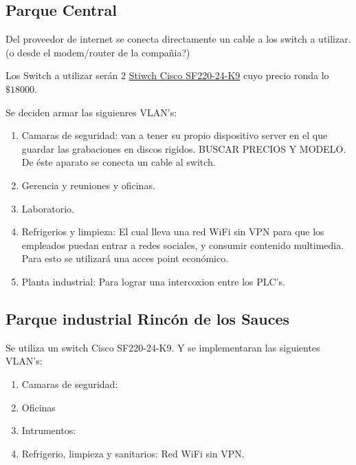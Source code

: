 \documentclass[11pt]{article}
\begin{document}
    \subsection*{Parque Central}

        Del proveedor de internet se conecta directamente un cable a los switch a utilizar. (o desde el modem/router de la compañia?)

        Los Switch a utilizar serán $2$ \href{https://articulo.mercadolibre.com.ar/MLA-714545399-switch-cisco-semi-admin-24-puertos-10100-2-giga-sf220-24-k9-_JM#position=34&type=item&tracking_id=4df4b6b4-1084-45cf-bab2-a07d312cf877}{Stiwch Cisco SF220-24-K9}
        cuyo precio ronda lo $\$18000$.


        Se deciden armar las siguienres VLAN's: 

        \begin{enumerate}
            \item Camaras de seguridad: van a tener su propio dispositivo server en el que guardar las grabaciones en discos rigidos. BUSCAR PRECIOS Y MODELO. De éste aparato se conecta un cable al switch.
            \item Gerencia y reuniones y oficinas.
            \item Laboratorio.
            \item Refrigerios y limpieza: El cual lleva una red WiFi sin VPN para que los empleados puedan entrar a redes sociales, y 
                consumir contenido multimedia. Para esto se utilizará una acces point económico.
            \item Planta industrial: Para lograr una intercoxion entre los PLC's.
        \end{enumerate}

        

    \subsection*{Parque industrial Rincón de los Sauces}

    Se utiliza un switch Cisco SF220-24-K9. Y se implementaran las siguientes VLAN's: 

    \begin{enumerate}
        \item Camaras de seguridad: 
        \item Oficinas 
        \item Intrumentos: 
        \item Refrigerio, limpieza y sanitarios: Red WiFi sin VPN. 
    \end{enumerate}
\end{document}
